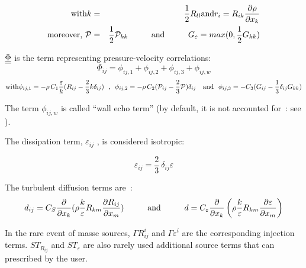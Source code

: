 \begin{eqnarray}
\text{with\hspace*{0cm}}\displaystyle k &=&\frac{1}{2}R_{ll}\text{%
\hspace*{0cm}and\hspace*{0cm}}\displaystyle r_{i}=R_{ik}\frac{\partial \rho
}{\partial x_{k}} \\
\text{moreover,  }\mathcal{P} &=&\frac{1}{2}\mathcal{P}_{kk}\text{%
\hspace*{1cm}and\hspace*{1cm}}G_{\varepsilon }=max(0,\frac{1}{2}G_{kk})
\end{eqnarray}

$\underline{\underline{\Phi}}$ is the term representing pressure-velocity correlations:
\begin{equation}
\displaystyle\Phi _{ij}=\phi _{ij,1}+\phi _{ij,2}+\phi _{ij,3}+\phi _{ij,w}
\end{equation}%
\begin{equation}
\text{with\hspace*{0cm}}\phi _{ij,1}=-\rho \,C_{1}\frac{\varepsilon }{k}%
(R_{ij}-\frac{2}{3}k\delta _{ij})\text{\ \ , \ }\phi _{ij,2}=-\rho \,C_{2}(%
\mathcal{P}_{ij}-\frac{2}{3}\mathcal{P})\delta _{ij}\text{\ \ \ and\ \ }\phi
_{ij,3}=-C_{3}(G_{ij}-\frac{1}{3}\delta _{ij}G_{kk})
\end{equation}

The term $\phi _{ij,w}$ is called ``wall echo term'' (by default, it is not
accounted for~: see ).

The dissipation term, $\varepsilon _{ij}$ , is considered isotropic:

\begin{equation}
\displaystyle\varepsilon _{ij}=\frac{2}{3}\ \delta _{ij}\varepsilon
\end{equation}

The turbulent diffusion terms are~:
\begin{equation}
d_{ij}=C_{S}\frac{\partial }{\partial x_{k}}(\rho \frac{k}{\varepsilon }%
R_{km}\frac{\partial R_{ij}}{\partial x_{m}})\text{\hspace*{1cm}and%
\hspace*{1cm}}{d}=C_{\varepsilon }\displaystyle\frac{\partial }{\partial
x_{k}}\left( \rho \frac{k}{\varepsilon }R_{km}\frac{\partial \varepsilon }{%
\partial x_{m}}\right)
\end{equation}

In the rare event of masse sources, $\Gamma R_{ij}^{i}$ and $\Gamma
\varepsilon ^{i}$ are the corresponding injection terms. $ST_{R_{ij}}$ and $%
ST_{\varepsilon }$ are also rarely used additional source terms that can
prescribed by the user.

